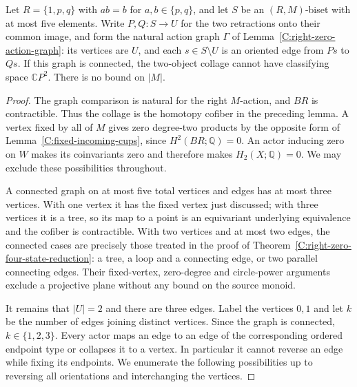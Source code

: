\begin{theorem}
\label{C:right-zero-five-connected}
Let $R=\{1,p,q\}$ with $ab=b$ for $a,b\in\{p,q\}$, and let $S$
be an $(R,M)$-biset with at most five elements. Write $P,Q:S\to U$
for the two retractions onto their common image, and form the
natural action graph $\Gamma$ of
Lemma~\ref{C:right-zero-action-graph}: its vertices are $U$, and
each $s\in S\setminus U$ is an oriented edge from $Ps$ to $Qs$.
If this graph is connected, the two-object collage cannot have
classifying space $\mathbb CP^2$. There is no bound on $|M|$.
\end{theorem}
\begin{proof}
The graph comparison is natural for the right $M$-action, and
$BR$ is contractible. Thus the collage is the homotopy cofiber
in the preceding lemma. A vertex fixed by all of $M$ gives zero
degree-two products by the opposite form of
Lemma~\ref{C:fixed-incoming-cups}, since $H^2(BR;\mathbb Q)=0$.
An actor inducing zero on $W$ makes its coinvariants zero and
therefore makes $H_2(X;\mathbb Q)=0$.
We may exclude these possibilities throughout.

A connected graph on at most five total vertices and edges has
at most three vertices. With one vertex it has the fixed vertex
just discussed; with three vertices it is a tree, so its map to
a point is an equivariant underlying equivalence and the cofiber
is contractible. With two vertices and at most two edges, the
connected cases are precisely those treated in the proof of
Theorem~\ref{C:right-zero-four-state-reduction}: a tree, a loop
and a connecting edge, or two parallel connecting edges. Their
fixed-vertex, zero-degree and circle-power arguments exclude a
projective plane without any bound on the source monoid.

It remains that $|U|=2$ and there are three edges. Label the
vertices $0,1$ and let $k$ be the number of edges joining distinct
vertices. Since the graph is connected, $k\in\{1,2,3\}$.
Every actor maps an edge to an edge of the corresponding ordered
endpoint type or collapses it to a vertex. In particular it cannot
reverse an edge while fixing its endpoints. We enumerate the
following possibilities up to reversing all orientations and
interchanging the vertices.


\end{proof}
